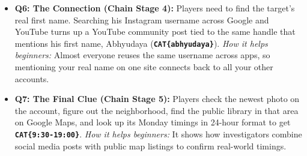 \documentclass[11pt,a4paper]{article}
\begin{document}
\begin{itemize}
    \item \textbf{Q6: The Connection (Chain Stage 4):} Players need to find the target's real first name. Searching his Instagram username across Google and YouTube turns up a YouTube community post tied to the same handle that mentions his first name, Abhyudaya (\textbf{\texttt{CAT\{abhyudaya\}}}). \textit{How it helps beginners:} Almost everyone reuses the same username across apps, so mentioning your real name on one site connects back to all your other accounts.
    \item \textbf{Q7: The Final Clue (Chain Stage 5):} Players check the newest photo on the account, figure out the neighborhood, find the public library in that area on Google Maps, and look up its Monday timings in 24-hour format to get \textbf{\texttt{CAT\{9:30-19:00\}}}. \textit{How it helps beginners:} It shows how investigators combine social media posts with public map listings to confirm real-world timings.
\end{itemize}
\end{document}
